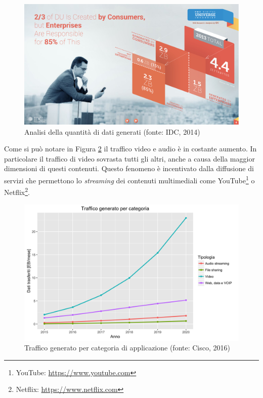 \begin{figure}[ht]
	\centering
	\includegraphics[width=\textwidth]{1-introduzione/Immagini/dati-generati-consumer.pdf}
	\caption[Analisi della quantità di dati generati]{Analisi della quantità di dati generati (fonte: IDC, 2014)\label{fig:analisi-dati-generati}}
\end{figure}

Come si può notare in Figura \ref{fig:traffico-categoria-applicazione} il traffico video e audio è in costante aumento. In particolare il traffico di video sovrasta tutti gli altri, anche a causa della maggior dimensioni di questi contenuti. Questo fenomeno è incentivato dalla diffusione di servizi che permettono lo \emph{streaming} dei contenuti multimediali come YouTube\footnote{YouTube: \url{https://www.youtube.com}} o Netflix\footnote{Netflix: \url{https://www.netflix.com}}.

\begin{figure}[ht]
	\centering
	\includegraphics[width=\textwidth]{1-introduzione/Immagini/traffico-categoria.png}
	\caption[Traffico generato per categoria di applicazione]{Traffico generato per categoria di applicazione (fonte: Cisco, 2016)\label{fig:traffico-categoria-applicazione}}
\end{figure}

